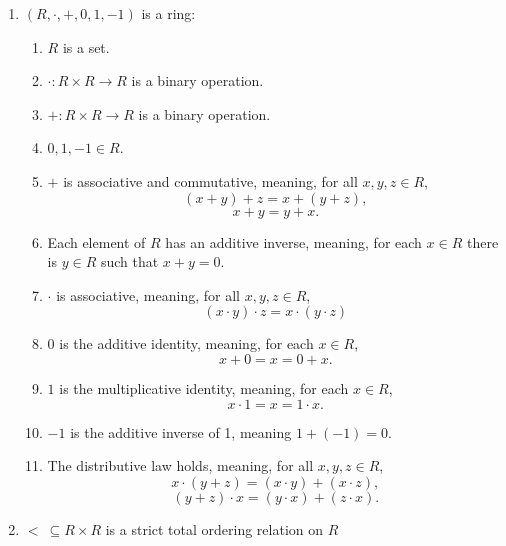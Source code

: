 \documentclass[11pt]{article}
\begin{document}
\begin{enumerate}
	\item $(R, \cdot, +, 0, 1, -1)$ is a ring:
		\begin{enumerate}
			\item $R$ is a set.
			\item $\cdot : R \times R \to R$ is a binary operation.
			\item $+ : R \times R \to R$ is a binary operation.
			\item $0, 1, -1 \in R$.
			\item $+$ is associative and commutative, meaning, for all $x, y, z \in R$,
				\begin{equation}
					(x+y)+z = x+(y+z),
				\end{equation}
				\begin{equation}
					x+y=y+x.
				\end{equation}
			\item Each element of $R$ has an additive inverse, meaning, for each $x \in R$ there is $y \in R$ such that $x + y = 0$.
			\item $\cdot$ is associative, meaning, for all $x, y, z \in R$,
				\begin{equation}
					(x\cdot y)\cdot z = x \cdot (y \cdot z)
				\end{equation}
			\item $0$ is the additive identity, meaning, for each $x \in R$,
				\begin{equation}
					x + 0 = x = 0 + x.
				\end{equation}
			\item $1$ is the multiplicative identity, meaning, for each $x \in R$,
				\begin{equation}
					x \cdot 1 = x = 1 \cdot x.
				\end{equation}
			\item $-1$ is the additive inverse of 1, meaning $1 + (-1) = 0$.
			\item The distributive law holds, meaning, for all $x, y, z \in R$,
				\begin{equation}
					x \cdot (y+z) = (x \cdot y) + (x \cdot z),
				\end{equation}
				\begin{equation}
					(y+z) \cdot x = (y \cdot x) + (z \cdot x).
				\end{equation}
		\end{enumerate}
	\item $<\ \subseteq R \times R$ is a strict total ordering relation on $R$

\end{enumerate}
\end{document}
